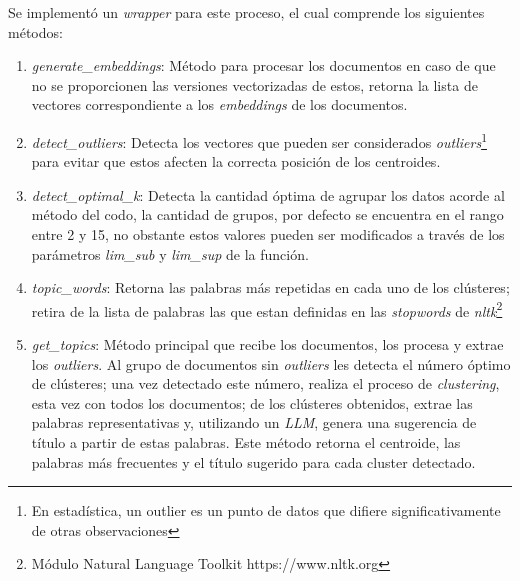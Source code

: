     Se implementó un \emph{wrapper} para este proceso, el cual comprende los siguientes métodos:
    \begin{enumerate}
        \item \emph{generate\_embeddings}: Método para procesar los documentos en caso de que no se proporcionen las versiones vectorizadas de estos, retorna la lista de vectores correspondiente a los \emph{embeddings} de los documentos.
        \item \emph{detect\_outliers}: Detecta los vectores que pueden ser considerados \emph{outliers}\footnote{En estadística, un outlier es un punto de datos que difiere significativamente de otras observaciones} para evitar que estos afecten la correcta posición de los centroides.
        \item \emph{detect\_optimal\_k}: Detecta la cantidad óptima de agrupar los datos acorde al método del codo, la cantidad de grupos, por defecto se encuentra en el rango entre 2 y 15, no obstante estos valores pueden ser modificados a través de los parámetros \emph{lim\_sub} y \emph{lim\_sup} de la función.
        \item \emph{topic\_words}: Retorna las palabras más repetidas en cada uno de los cl\'usteres; retira de la lista de palabras las que estan definidas en las \emph{stopwords} de \emph{nltk}\footnote{Módulo Natural Language Toolkit https://www.nltk.org}
        \item \emph{get\_topics}: Método principal que recibe los documentos, los procesa y extrae los \emph{outliers}. Al grupo de documentos sin \emph{outliers} les detecta el número óptimo de cl\'usteres; una vez detectado este número, realiza el proceso de \emph{clustering}, esta vez con todos los documentos; de los cl\'usteres obtenidos, extrae las palabras representativas y, utilizando un \emph{LLM}, genera una sugerencia de título a partir de estas palabras. Este método retorna el centroide, las palabras más frecuentes y el título sugerido para cada cluster detectado.
    \end{enumerate}

